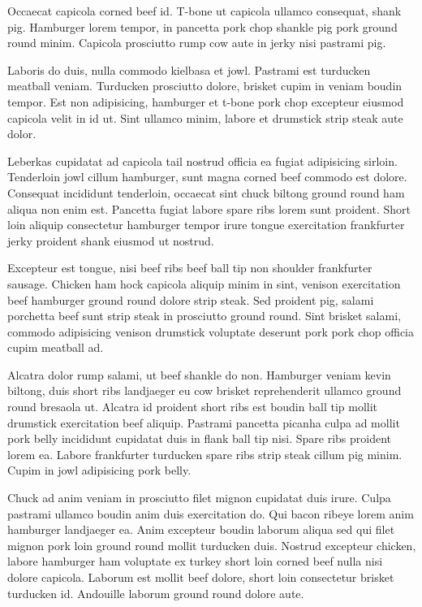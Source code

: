 Occaecat capicola corned beef id. T-bone ut capicola ullamco consequat, shank pig. Hamburger lorem tempor, in pancetta pork chop shankle pig pork ground round minim. Capicola prosciutto rump cow aute in jerky nisi pastrami pig.

Laboris do duis, nulla commodo kielbasa et jowl. Pastrami est turducken meatball veniam. Turducken prosciutto dolore, brisket cupim in veniam boudin tempor. Est non adipisicing, hamburger et t-bone pork chop excepteur eiusmod capicola velit in id ut. Sint ullamco minim, labore et drumstick strip steak aute dolor.

Leberkas cupidatat ad capicola tail nostrud officia ea fugiat adipisicing sirloin. Tenderloin jowl cillum hamburger, sunt magna corned beef commodo est dolore. Consequat incididunt tenderloin, occaecat sint chuck biltong ground round ham aliqua non enim est. Pancetta fugiat labore spare ribs lorem sunt proident. Short loin aliquip consectetur hamburger tempor irure tongue exercitation frankfurter jerky proident shank eiusmod ut nostrud.

Excepteur est tongue, nisi beef ribs beef ball tip non shoulder frankfurter sausage. Chicken ham hock capicola aliquip minim in sint, venison exercitation beef hamburger ground round dolore strip steak. Sed proident pig, salami porchetta beef sunt strip steak in prosciutto ground round. Sint brisket salami, commodo adipisicing venison drumstick voluptate deserunt pork pork chop officia cupim meatball ad.

Alcatra dolor rump salami, ut beef shankle do non. Hamburger veniam kevin biltong, duis short ribs landjaeger eu cow brisket reprehenderit ullamco ground round bresaola ut. Alcatra id proident short ribs est boudin ball tip mollit drumstick exercitation beef aliquip. Pastrami pancetta picanha culpa ad mollit pork belly incididunt cupidatat duis in flank ball tip nisi. Spare ribs proident lorem ea. Labore frankfurter turducken spare ribs strip steak cillum pig minim. Cupim in jowl adipisicing pork belly.

Chuck ad anim veniam in prosciutto filet mignon cupidatat duis irure. Culpa pastrami ullamco boudin anim duis exercitation do. Qui bacon ribeye lorem anim hamburger landjaeger ea. Anim excepteur boudin laborum aliqua sed qui filet mignon pork loin ground round mollit turducken duis. Nostrud excepteur chicken, labore hamburger ham voluptate ex turkey short loin corned beef nulla nisi dolore capicola. Laborum est mollit beef dolore, short loin consectetur brisket turducken id. Andouille laborum ground round dolore aute.

